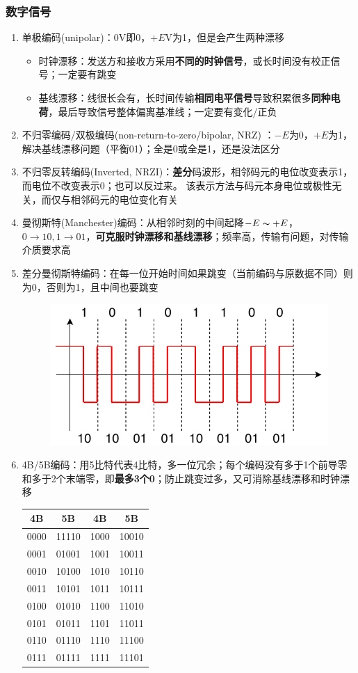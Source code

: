 \subsubsection{数字信号}
\begin{enumerate}
\item 单极编码(unipolar)：0V即0，$+E$V为1，但是会产生两种漂移
\begin{itemize}
	\item 时钟漂移：发送方和接收方采用\textbf{不同的时钟信号}，或长时间没有校正信号；一定要有跳变
	\item 基线漂移：线很长会有，长时间传输\textbf{相同电平信号}导致积累很多\textbf{同种电荷}，最后导致信号整体偏离基准线；一定要有变化/正负
\end{itemize}
\item 不归零编码/双极编码(non-return-to-zero/bipolar, NRZ) ：$-E$为0，$+E$为1，解决基线漂移问题（平衡01）；全是0或全是1，还是没法区分
\item 不归零反转编码(Inverted, NRZI)：\textbf{差分}码波形，相邻码元的电位改变表示1，而电位不改变表示0；也可以反过来。 该表示方法与码元本身电位或极性无关，而仅与相邻码元的电位变化有关
\item 曼彻斯特(Manchester)编码：从相邻时刻的中间起降$-E\thicksim +E$，$0\to 10, 1\to 01$，\textbf{可克服时钟漂移和基线漂移}；频率高，传输有问题，对传输介质要求高
\item 差分曼彻斯特编码：在每一位开始时间如果跳变（当前编码与原数据不同）则为0，否则为1，且中间也要跳变
\begin{figure}[H]
	\centering
	\includegraphics[width=0.5\linewidth]{fig/network-manchester.pdf}
\end{figure}
\item 4B/5B编码：用5比特代表4比特，多一位冗余；每个编码没有多于1个前导零和多于2个末端零，即\textbf{最多3个0}；防止跳变过多，又可消除基线漂移和时钟漂移
\begin{center}
\begin{tabular}{|c|c||c|c|}\hline
4B & 5B & 4B & 5B\\\hline\hline
0000 & 11110 & 1000 & 10010\\\hline
0001 & 01001 & 1001 & 10011\\\hline
0010 & 10100 & 1010 & 10110\\\hline
0011 & 10101 & 1011 & 10111\\\hline
0100 & 01010 & 1100 & 11010\\\hline
0101 & 01011 & 1101 & 11011\\\hline
0110 & 01110 & 1110 & 11100\\\hline
0111 & 01111 & 1111 & 11101\\\hline
\end{tabular}
\end{center}
\end{enumerate}

